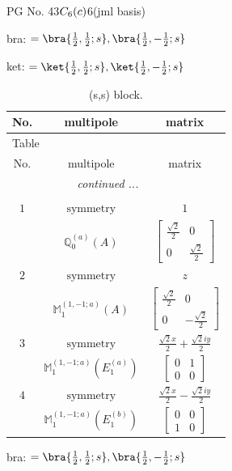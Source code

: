 \documentclass[fleqn,8pt,landscape]{jsarticle}
\begin{document}
\setcounter{MaxMatrixCols}{32}

\renewcommand{\tablename}{Table~}
\renewcommand{\figurename}{Figure~}
\begin{center}
\LARGE
PG No. 43\quad$C_{\rm 6}(c)$\quad$6$\quad[ hexagonal ] (jml basis)
\end{center}
bra: $=\bra{\frac{1}{2},\frac{1}{2};s}, \bra{\frac{1}{2},- \frac{1}{2};s}$

\noindent
ket: $=\ket{\frac{1}{2},\frac{1}{2};s}, \ket{\frac{1}{2},- \frac{1}{2};s}$
\renewcommand{\arraystretch}{1.6}
\begin{longtable}{ccc}
\caption{(s,s) block.}
 \\
 \hline \hline
No. & multipole & matrix \\ \hline \endfirsthead

\multicolumn{2}{l}{\tablename\ \thetable{}} \\
 \hline \hline
No. & multipole & matrix \\ \hline \endhead

 \hline \hline
\multicolumn{2}{r}{\footnotesize\it continued ...} \\ \endfoot

 \hline \hline
\multicolumn{2}{r}{} \\ \endlastfoot

$ 1 $ & $ \text{symmetry} $ & $ 1 $ \\
$  $ & $ \mathbb{Q}_{0}^{(a)}(A) $ & $ \begin{bmatrix} \frac{\sqrt{2}}{2} & 0 \\ 0 & \frac{\sqrt{2}}{2} \end{bmatrix} $ \\ \hline
$ 2 $ & $ \text{symmetry} $ & $ z $ \\
$  $ & $ \mathbb{M}_{1}^{(1,-1;a)}(A) $ & $ \begin{bmatrix} \frac{\sqrt{2}}{2} & 0 \\ 0 & - \frac{\sqrt{2}}{2} \end{bmatrix} $ \\ \hline
$ 3 $ & $ \text{symmetry} $ & $ \frac{\sqrt{2} x}{2} + \frac{\sqrt{2} i y}{2} $ \\
$  $ & $ \mathbb{M}_{1}^{(1,-1;a)}(E_{1}^{(a)}) $ & $ \begin{bmatrix} 0 & 1 \\ 0 & 0 \end{bmatrix} $ \\ \hline
$ 4 $ & $ \text{symmetry} $ & $ \frac{\sqrt{2} x}{2} - \frac{\sqrt{2} i y}{2} $ \\
$  $ & $ \mathbb{M}_{1}^{(1,-1;a)}(E_{1}^{(b)}) $ & $ \begin{bmatrix} 0 & 0 \\ 1 & 0 \end{bmatrix} $ \\ \hline
\end{longtable}
bra: $=\bra{\frac{1}{2},\frac{1}{2};s}, \bra{\frac{1}{2},- \frac{1}{2};s}$
\end{document}
